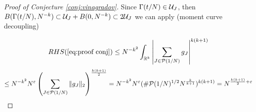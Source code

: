 \begin{proof}[Proof of Conjecture \ref{conj:vinagradov}]
Since $\Gamma(t/N)\in \mathcal{U}_{J}$, then $B(\Gamma(t/N),N^{-k})\subset \mathcal{U}_{J} + B(0,N^{-k}) \subset 2\mathcal{U}_{J}$ we can apply (moment curve decoupling)


\begin{equation}
    RHS(\ref{eq:proof conj}) \leq N^{-k^{2}} \int_{\mathbb{R}^{k}} \left|\sum_{J\in\mathcal{P}(1/N)}g_{J} \right|^{k(k+1)}
\end{equation}
\begin{equation}
    \leq N^{-k^{2}} N^{\varepsilon} \left( \sum_{J\in \mathcal{P}(1/N)}\|g_{J} \|_{2}\right)^{\frac{k(k+1)}{2}} = N^{-k^{2}} N^{\varepsilon} (\#\mathcal{P}(1/N)^{1/2}N^{\frac{k}{k+1}})^{k(k+1)} = N^{\frac{k(k+1)}{2}+\varepsilon}
\end{equation}
\end{proof}

